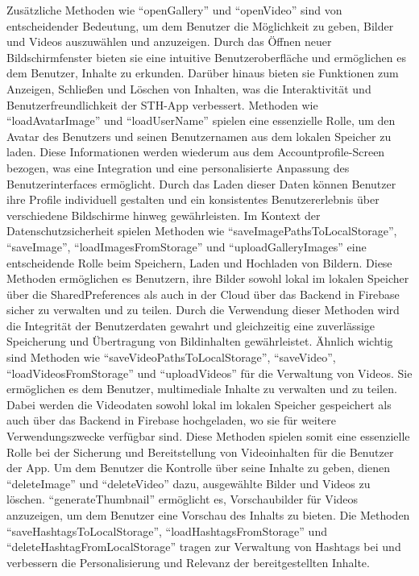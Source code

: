 Zusätzliche Methoden wie ``openGallery'' und ``openVideo'' sind von entscheidender Bedeutung, um dem Benutzer die Möglichkeit zu geben, Bilder und Videos auszuwählen und anzuzeigen. 
Durch das Öffnen neuer Bildschirmfenster bieten sie eine intuitive Benutzeroberfläche und ermöglichen es dem Benutzer, Inhalte zu erkunden. 
Darüber hinaus bieten sie Funktionen zum Anzeigen, Schließen und Löschen von Inhalten, was die Interaktivität und Benutzerfreundlichkeit der STH-App verbessert.
Methoden wie ``loadAvatarImage'' und ``loadUserName'' spielen eine essenzielle Rolle, um den Avatar des Benutzers und seinen Benutzernamen aus dem lokalen Speicher zu laden. 
Diese Informationen werden wiederum aus dem Accountprofile-Screen bezogen, was eine Integration und eine personalisierte Anpassung des Benutzerinterfaces ermöglicht. 
Durch das Laden dieser Daten können Benutzer ihre Profile individuell gestalten und ein konsistentes Benutzererlebnis über verschiedene Bildschirme hinweg gewährleisten. 
Im Kontext der Datenschutzsicherheit spielen Methoden wie ``saveImagePathsToLocalStorage'', ``saveImage'', ``loadImagesFromStorage'' und ``uploadGalleryImages'' eine entscheidende Rolle beim Speichern, Laden und Hochladen von Bildern. 
Diese Methoden ermöglichen es Benutzern, ihre Bilder sowohl lokal im lokalen Speicher über die SharedPreferences als auch in der Cloud über das Backend in Firebase sicher zu verwalten und zu teilen. 
Durch die Verwendung dieser Methoden wird die Integrität der Benutzerdaten gewahrt und gleichzeitig eine zuverlässige Speicherung und Übertragung von Bildinhalten gewährleistet. 
Ähnlich wichtig sind Methoden wie ``saveVideoPathsToLocalStorage'', ``saveVideo'', ``loadVideosFromStorage'' und ``uploadVideos'' für die Verwaltung von Videos.
Sie ermöglichen es dem Benutzer, multimediale Inhalte zu verwalten und zu teilen. Dabei werden die Videodaten sowohl lokal im lokalen Speicher gespeichert als auch über das Backend in Firebase hochgeladen, wo sie für weitere Verwendungszwecke verfügbar sind.
Diese Methoden spielen somit eine essenzielle Rolle bei der Sicherung und Bereitstellung von Videoinhalten für die Benutzer der App.
Um dem Benutzer die Kontrolle über seine Inhalte zu geben, dienen ``deleteImage'' und ``deleteVideo'' dazu, ausgewählte Bilder und Videos zu löschen. 
``generateThumbnail'' ermöglicht es, Vorschaubilder für Videos anzuzeigen, um dem Benutzer eine Vorschau des Inhalts zu bieten.
Die Methoden ``saveHashtagsToLocalStorage'', ``loadHashtagsFromStorage'' und ``deleteHashtagFromLocalStorage'' tragen zur Verwaltung von Hashtags bei und verbessern die Personalisierung und Relevanz der bereitgestellten Inhalte. 
